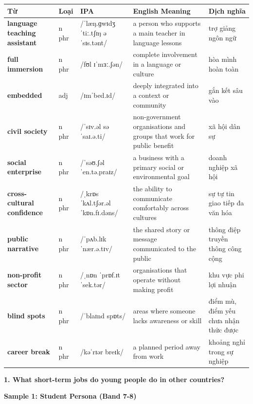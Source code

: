 \vspace{0.8em}
\begin{center}
\renewcommand{\arraystretch}{1.65}
\begin{tabularx}{\textwidth}{|V{0.22\textwidth}|C{0.07\textwidth}|I{0.20\textwidth}|Y|V{0.18\textwidth}|}
\hline
{}
\textbf{Từ} & \textbf{Loại} & \textbf{IPA} & \textbf{English Meaning} & \textbf{Dịch nghĩa} \\
\hline
\textbf{language teaching assistant} & n phr & /ˈlæŋ.ɡwɪdʒ ˈtiː.tʃɪŋ əˈsɪs.tənt/ & a person who supports a main teacher in language lessons & trợ giảng ngôn ngữ \\ \hline
\textbf{full immersion} & n phr & /fʊl ɪˈmɜː.ʃən/ & complete involvement in a language or culture & hòa mình hoàn toàn \\ \hline
\textbf{embedded} & adj & /ɪmˈbed.ɪd/ & deeply integrated into a context or community & gắn kết sâu vào \\ \hline
\textbf{civil society} & n phr & /ˈsɪv.əl səˈsaɪ.ə.ti/ & non-government organisations and groups that work for public benefit & xã hội dân sự \\ \hline
\textbf{social enterprise} & n phr & /ˈsəʊ.ʃəl ˈen.tə.praɪz/ & a business with a primary social or environmental goal & doanh nghiệp xã hội \\ \hline
\textbf{cross-cultural confidence} & n phr & /ˌkrɒs ˈkʌl.tʃər.əl ˈkɒn.fɪ.dəns/ & the ability to communicate comfortably across cultures & sự tự tin giao tiếp đa văn hóa \\ \hline
\textbf{public narrative} & n phr & /ˈpʌb.lɪk ˈnær.ə.tɪv/ & the shared story or message communicated to the public & thông điệp truyền thông công cộng \\ \hline
\textbf{non-profit sector} & n phr & /ˌnɒn ˈprɒf.ɪt ˈsek.tər/ & organisations that operate without making profit & khu vực phi lợi nhuận \\ \hline
\textbf{blind spots} & n phr & /ˈblaɪnd spɒts/ & areas where someone lacks awareness or skill & điểm mù, điểm yếu chưa nhận thức được \\ \hline
\textbf{career break} & n phr & /kəˈrɪər breɪk/ & a planned period away from work & khoảng nghỉ trong sự nghiệp \\ \hline
\end{tabularx}
\end{center}

\partthreeheader

\begin{ieltsquestion}
\textbf{1. What short-term jobs do young people do in other countries?}
\end{ieltsquestion}
\textbf{Sample 1: Student Persona (Band 7-8)}

